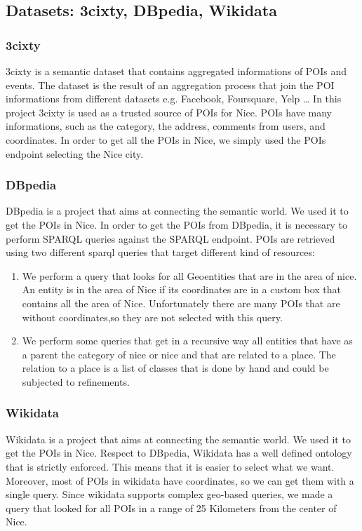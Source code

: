 \subsection{Datasets: 3cixty, DBpedia, Wikidata}
\subsubsection{3cixty}
3cixty is a semantic dataset that contains aggregated informations of POIs and events. The dataset is the result of an aggregation process that join the POI informations from different datasets e.g. Facebook, Foursquare, Yelp \dots
In this project 3cixty is used as a trusted source of POIs for Nice.
POIs have many informations, such as the category, the address, comments from users, and coordinates. In order to get all the POIs in Nice, we simply used the POIs endpoint selecting the Nice city.
\subsubsection{DBpedia}
DBpedia is a project that aims at connecting the semantic world. We used it to get the POIs in Nice.
In order to get the POIs from DBpedia, it is necessary to perform SPARQL queries against the SPARQL endpoint. POIs are retrieved using two different sparql queries that target different kind of resources:
\begin{enumerate}
\item We perform a query that looks for all Geoentities that are in the area of nice. An entity is in the area of Nice if its coordinates are in a custom box that contains all the area of Nice.
Unfortunately there are many POIs that are without coordinates,so they are not selected with this query.
\item We perform some queries that get in a recursive way all entities that have as a parent the category of nice or nice and that are related to a place. The relation to a place is a list of classes that is done by hand and could be subjected to refinements.
\end{enumerate}
\subsubsection{Wikidata}
Wikidata is a project that aims at connecting the semantic world. We used it to get the POIs in Nice. Respect to DBpedia, Wikidata has a well defined ontology that is strictly enforced. This means that it is easier to select what we want. Moreover, most of POIs in wikidata have coordinates, so we can get them with a single query. Since wikidata supports complex geo-based queries, we made a query that looked for all POIs in a range of 25 Kilometers from the center of Nice.
